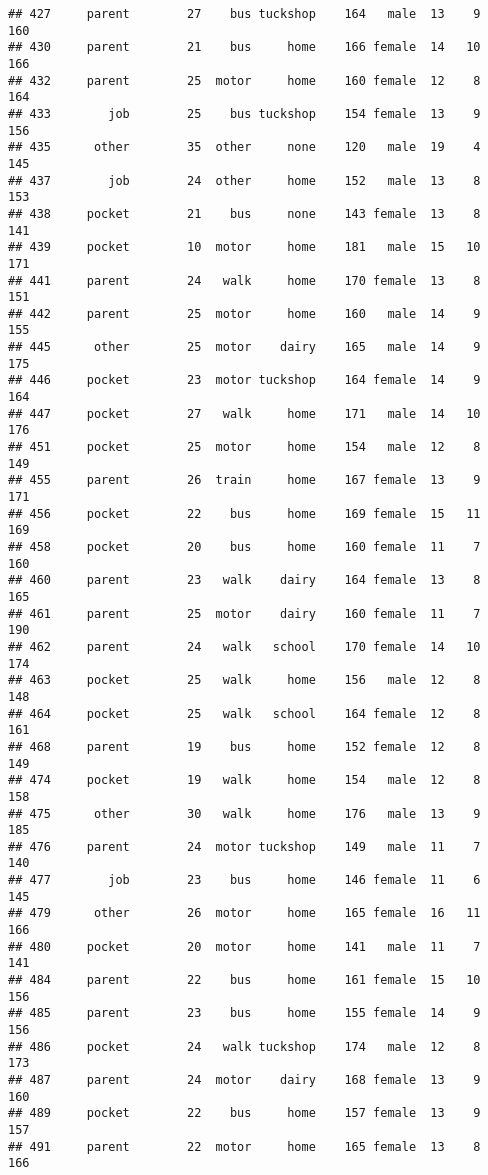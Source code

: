 \documentclass[
]{article}
\begin{document}
\begin{verbatim}
## 427     parent        27    bus tuckshop    164   male  13    9     160
## 430     parent        21    bus     home    166 female  14   10     166
## 432     parent        25  motor     home    160 female  12    8     164
## 433        job        25    bus tuckshop    154 female  13    9     156
## 435      other        35  other     none    120   male  19    4     145
## 437        job        24  other     home    152   male  13    8     153
## 438     pocket        21    bus     none    143 female  13    8     141
## 439     pocket        10  motor     home    181   male  15   10     171
## 441     parent        24   walk     home    170 female  13    8     151
## 442     parent        25  motor     home    160   male  14    9     155
## 445      other        25  motor    dairy    165   male  14    9     175
## 446     pocket        23  motor tuckshop    164 female  14    9     164
## 447     pocket        27   walk     home    171   male  14   10     176
## 451     pocket        25  motor     home    154   male  12    8     149
## 455     parent        26  train     home    167 female  13    9     171
## 456     pocket        22    bus     home    169 female  15   11     169
## 458     pocket        20    bus     home    160 female  11    7     160
## 460     parent        23   walk    dairy    164 female  13    8     165
## 461     parent        25  motor    dairy    160 female  11    7     190
## 462     parent        24   walk   school    170 female  14   10     174
## 463     pocket        25   walk     home    156   male  12    8     148
## 464     pocket        25   walk   school    164 female  12    8     161
## 468     parent        19    bus     home    152 female  12    8     149
## 474     pocket        19   walk     home    154   male  12    8     158
## 475      other        30   walk     home    176   male  13    9     185
## 476     parent        24  motor tuckshop    149   male  11    7     140
## 477        job        23    bus     home    146 female  11    6     145
## 479      other        26  motor     home    165 female  16   11     166
## 480     pocket        20  motor     home    141   male  11    7     141
## 484     parent        22    bus     home    161 female  15   10     156
## 485     parent        23    bus     home    155 female  14    9     156
## 486     pocket        24   walk tuckshop    174   male  12    8     173
## 487     parent        24  motor    dairy    168 female  13    9     160
## 489     pocket        22    bus     home    157 female  13    9     157
## 491     parent        22  motor     home    165 female  13    8     166

\end{verbatim}
\end{document}
